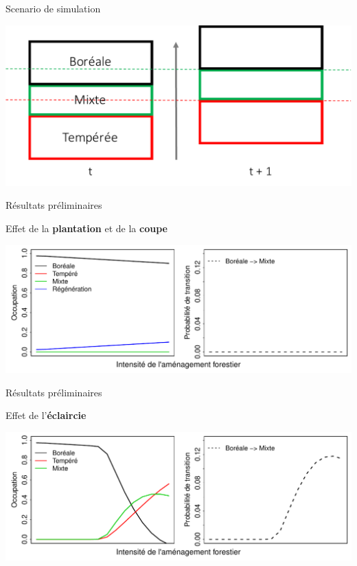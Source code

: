 \documentclass[11pt, compress, aspectratio=1610]{beamer}
\begin{document}
\begin{frame}{Scenario de simulation}

\centering
 \includegraphics[scale=0.65]{figures/migration.pdf}\par

\end{frame}

\begin{frame}{Résultats préliminaires}

Effet de la \textbf{plantation} et de la \textbf{coupe}

\centering
 \includegraphics[scale=0.65]{figures/result0.pdf}\par

\end{frame}

\begin{frame}{Résultats préliminaires}

Effet de l'\textbf{éclaircie}

\centering
 \includegraphics[scale=0.65]{figures/result1.pdf}\par

\end{frame}
\end{document}
